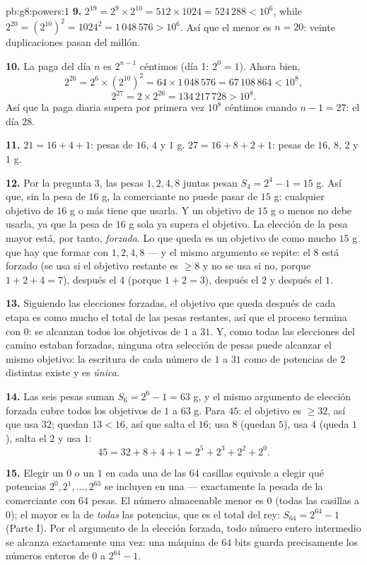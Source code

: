 \begin{solution}{pb:g8:powers:1}
\textbf{9.} $2^{19} = 2^9 \times 2^{10} = 512 \times 1024 =
524\,288 < 10^6$, while $2^{20} = \left(2^{10}\right)^2 =
1024^2 = 1\,048\,576 > 10^6$. Así que el menor  es
$n = 20$: veinte duplicaciones pasan del millón.

\textbf{10.} La paga del día $n$ es $2^{n-1}$ céntimos (día 1:
$2^0 = 1$). Ahora bien,
\[
2^{26} = 2^6 \times \left(2^{10}\right)^2
= 64 \times 1\,048\,576 = 67\,108\,864 < 10^8,
\]
\[
2^{27} = 2 \times 2^{26} = 134\,217\,728 > 10^8 .
\]
Así que la paga diaria supera por primera vez $10^8$ céntimos cuando $n - 1 = 27$:
el día $28$.

\textbf{11.} $21 = 16 + 4 + 1$: pesas de $16$, $4$ y $1$ g.
$27 = 16 + 8 + 2 + 1$: pesas de $16$, $8$, $2$ y $1$ g.

\textbf{12.} Por la pregunta 3, las pesas $1, 2, 4, 8$ juntas
pesan $S_4 = 2^4 - 1 = 15$ g. Así que, sin la pesa de $16$ g, la
comerciante no puede pasar de $15$ g: cualquier objetivo de $16$ g o más tiene que
usarla. Y un objetivo de $15$ g o menos no debe usarla, ya que la
pesa de $16$ g sola ya supera el objetivo. La elección de la
pesa mayor está, por tanto, \emph{forzada}. Lo que queda es un
objetivo de como mucho $15$ g que hay que formar con $1, 2, 4, 8$ --- y
el mismo argumento se repite: el $8$ está forzado (se usa si el objetivo
restante es $\geq 8$ y no se usa si no, porque $1 + 2 + 4 = 7$),
después el $4$ (porque $1 + 2 = 3$), después el $2$ y después el $1$.

\textbf{13.} Siguiendo las elecciones forzadas, el objetivo que queda
después de cada etapa es como mucho el total de las pesas restantes,
así que el proceso termina con  $0$: se alcanzan todos los objetivos de $1$ a
$31$. Y, como todas las elecciones del camino estaban forzadas,
ninguna otra selección de pesas puede alcanzar el mismo objetivo: la
escritura de cada número de $1$ a $31$ como  de potencias de $2$
distintas existe y es \emph{única}.

\textbf{14.} Las seis pesas suman $S_6 = 2^6 - 1 = 63$ g, y
el mismo argumento de elección forzada cubre todos los objetivos de $1$ a
$63$ g. Para $45$: el objetivo es $\geq 32$, así que usa $32$; quedan
$13 < 16$, así que salta el $16$; usa $8$ (quedan $5$), usa $4$ (queda
$1$), salta el $2$ y usa $1$:
\[
45 = 32 + 8 + 4 + 1 = 2^5 + 2^3 + 2^2 + 2^0 .
\]

\textbf{15.} Elegir un $0$ o un $1$ en cada una de las $64$ casillas
equivale a elegir qué potencias $2^0, 2^1, \dots, 2^{63}$ se
incluyen en una  --- exactamente la pesada de la comerciante con $64$
pesas. El número almacenable menor es $0$ (todas las casillas a
$0$); el mayor es la  de \emph{todas} las potencias, que es
el total del rey: $S_{64} = 2^{64} - 1$ (Parte I). Por el
argumento de la elección forzada, todo número entero intermedio se alcanza
exactamente una vez: una máquina de $64$ bits guarda precisamente los números
enteros de $0$ a $2^{64} - 1$.
\end{solution}
